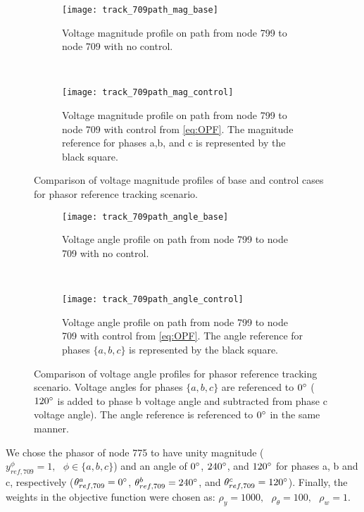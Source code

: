 \setlength{\belowcaptionskip}{0pt}
\setlength{\textfloatsep}{0pt}
\begin{figure}[ht]
	\centering
    \begin{subfigure}{21pc}
        \centering
        \texttt{[image: track\_709path\_mag\_base]}
        \caption{Voltage magnitude profile on path from node 799 to node 709 with no control.}
        \label{fig:track_709path_mag_base}
    \end{subfigure}
    \\
    \begin{subfigure}{21pc}
        \centering
        \texttt{[image: track\_709path\_mag\_control]}
        \caption{Voltage magnitude profile on path from node 799 to node 709 with control from \eqref{eq:OPF}. The magnitude reference for phases a,b, and c is represented by the black square.}
        \label{fig:track_709path_mag_control}
    \end{subfigure}
    \caption{Comparison of voltage magnitude profiles of base and control cases for phasor reference tracking scenario.}
    \label{fig:track_709path_mag}
    \begin{subfigure}{21pc}
    	\centering
        \texttt{[image: track\_709path\_angle\_base]}
        \caption{Voltage angle profile on path from node 799 to node 709 with no control.}
        \label{fig:track_709path_angle_base}
    \end{subfigure}
    \\
    \begin{subfigure}{21pc}
        \centering
        \texttt{[image: track\_709path\_angle\_control]}
        \caption{Voltage angle profile on path from node 799 to node 709 with control from \eqref{eq:OPF}. The angle reference for phases $\{ a, b, c \}$ is represented by the black square.}
        \label{fig:track_709path_angle_control}
    \end{subfigure}
    \caption{Comparison of voltage angle profiles for phasor reference tracking scenario. Voltage angles for phases $\{ a, b, c \}$ are referenced to $0\degree$ ($120\degree$ is added to phase b voltage angle and subtracted from phase c voltage angle). The angle reference  is referenced to $0\degree$ in the same manner.}
    \label{fig:track_709path_angle}
\end{figure}

We chose the phasor of node 775 to have unity magnitude ($y_{ref,709}^{\phi} = 1, \text{ } \phi \in \{ a, b, c \}$) and an angle of $0\degree$, $240\degree$, and $120\degree$ for phases a, b and c, respectively ($\theta_{ref,709}^{a} = 0\degree$, $\theta_{ref,709}^{b} = 240\degree$, and $ \theta_{ref,709}^{c} = 120\degree$). Finally, the weights in the objective function were chosen as: $\rho_{y} = 1000, \text{ } \rho_{\theta} = 100, \text{ } \rho_{w} = 1$.

